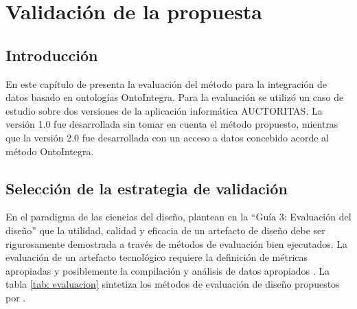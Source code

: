 \chapter{\large Validación de la propuesta}\label{Capítulo 3}

\pagestyle{fancy}
\lhead{}
\chead{}
\lfoot{}
\cfoot{}
\rfoot{\thepage}
\renewcommand{\headrulewidth}{0.4pt}
\vspace{-1cm}

\section{Introducción}
En este capítulo de presenta la evaluación del método para la integración de datos basado en ontologías OntoIntegra. Para la evaluación se utilizó un caso de estudio sobre dos versiones de la aplicación informática AUCTORITAS. La versión 1.0 fue desarrollada sin tomar en cuenta el método propuesto, mientras que la versión 2.0 fue desarrollada con un acceso a datos concebido acorde al método OntoIntegra.

\section{Selección de la estrategia de validación}
En el paradigma de las ciencias del diseño, \cite{Hevner:2004:DSI:2017212.2017217} plantean en la ``Guía 3: Evaluación del diseño'' que la utilidad, calidad y eficacia de un artefacto de diseño debe ser rigurosamente demostrada a través de métodos de evaluación bien ejecutados. La evaluación de un artefacto tecnológico requiere la definición de métricas apropiadas y posiblemente la compilación y análisis de datos apropiados \citep{Hevner:2004:DSI:2017212.2017217}. La tabla \ref{tab: evaluacion} sintetiza los métodos de evaluación de diseño propuestos por \cite{Hevner:2004:DSI:2017212.2017217}.

